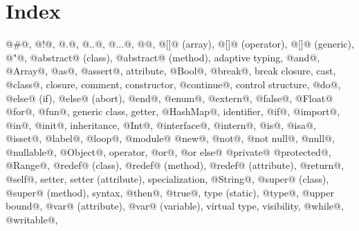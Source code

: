 \section{Index}\label{index}{\small\raggedleft
@#@,
@!@,
@.@,
@..@,
@...@,
@{}@,
@[]@ (array),
@[]@ (operator),
@[]@ (generic),
@"@,
@abstract@ (class),
@abstract@ (method),
adaptive typing,
@and@,
@Array@,
@as@,
@assert@,
attribute,
@Bool@,
@break@,
break closure,
cast,
@class@,
closure,
comment,
constructor,
@continue@,
control structure,
@do@,
@else@ (if),
@else@ (abort),
@end@,
@enum@,
@extern@,
@false@,
@Float@
@for@,
@fun@,
generic class,
getter,
@HashMap@,
identifier,
@if@,
@import@,
@in@,
@init@,
inheritance,
@Int@,
@interface@,
@intern@,
@is@,
@isa@,
@isset@,
@label@,
@loop@,
@module@
@new@,
@not@,
@not null@,
@null@,
@nullable@,
@Object@,
operator,
@or@,
@or else@ 
@private@
@protected@,
@Range@,
@redef@ (class),
@redef@ (method),
@redef@ (attribute),
@return@,
@self@,
setter,
setter (attribute),
specialization,
@String@,
@super@ (class),
@super@ (method),
syntax,
@then@,
@true@,
type (static),
@type@,
@upper bound@,
@var@ (attribute),
@var@ (variable),
virtual type,
visibility,
@while@,
@writable@,
}

